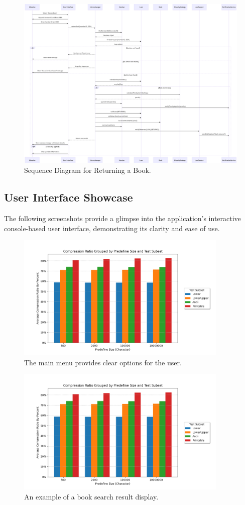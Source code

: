 \begin{figure}[H]
	\centering
	\includegraphics[width=\textwidth]{figures/sequence_return.png}
	\caption{Sequence Diagram for Returning a Book.}
	\label{fig:seq_return}
\end{figure}

\newpage

\subsection{User Interface Showcase}
The following screenshots provide a glimpse into the application's interactive console-based user interface, demonstrating its clarity and ease of use.

\begin{figure}[H]
	\centering
	\includegraphics[width=0.9\textwidth]{figures/screenshot_main_menu.png}
	\caption{The main menu provides clear options for the user.}
	\label{fig:ss_main_menu}
\end{figure}

\begin{figure}[H]
	\centering
	\includegraphics[width=0.9\textwidth]{figures/screenshot_search_result.png}
	\caption{An example of a book search result display.}
	\label{fig:ss_search}
\end{figure}